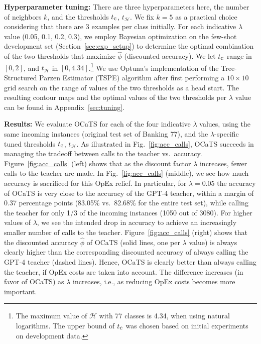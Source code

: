 \documentclass[11pt]{article}
\begin{document}
\vspace{1mm}\noindent\textbf{Hyperparameter tuning:} 
There are three hyperparameters here, the number of neighbors $k$, and the thresholds $t_{\textrm{\small c}}$, $t_\mathcal{H}$. We fix $k=5$ as a practical choice considering that there are 3 examples per class initially. For each indicative $\lambda$ value (0.05, 0.1, 0.2, 0.3), we employ Bayesian optimization on the few-shot development set (Section~\ref{sec:exp_setup}) to determine the optimal combination of the two thresholds that maximize $\hat\phi$ (discounted accuracy). We let $t_{\textrm{\small c}}$ range in $[0,2]$, and $t_\mathcal{H}$ in $[0,4.34]$.\footnote{The maximum  value of $\mathcal{H}$ with 77 classes is 4.34, when using natural logarithms. The upper bound of $t_{\textrm{\small c}}$ was chosen based on initial experiments on development data.} We use Optuna's \cite{optuna_2019} implementation of the Tree-Structured Parzen Estimator (TSPE) algorithm \cite{NIPS2011_86e8f7ab} after first performing a $10\times 10$ grid search on the range of values of the two thresholds as a head start. The resulting contour maps and the optimal values of the two thresholds per $\lambda$ value can be found in Appendix~\ref{sec:tuning}. 


\label{section:results}

\vspace{1mm}\noindent\textbf{Results:} We evaluate OCaTS for each of the four indicative $\lambda$ values, using the same incoming instances (original test set of Banking 77), and the $\lambda$-specific tuned thresholds $t_{\textrm{\small c}}$, $t_\mathcal{H}$. As illustrated in Fig.~\ref{fig:acc_calls}, OCaTS succeeds in managing the tradeoff between calls to the teacher vs.\ accuracy. Figure~\ref{fig:acc_calls} (left) shows that as the discount factor $\lambda$ increases, fewer calls to the teacher are made. In Fig.~\ref{fig:acc_calls} (middle), we see how much accuracy is sacrificed for this OpEx relief. In particular, for $\lambda=0.05$ the accuracy of OCaTS is very close to the accuracy of the GPT-4 teacher, within a margin of 0.37 percentage points (83.05\% vs.\ 82.68\% for the entire test set), while calling the teacher for only 1/3 of the incoming instances (1050 out of 3080). For higher values of $\lambda$, we see the intended drop in accuracy to achieve an increasingly smaller number of calls to the teacher. Figure~\ref{fig:acc_calls} (right) shows that the discounted accuracy $\hat\phi$ of OCaTS (solid lines, one per $\lambda$ value) is always clearly higher than the corresponding discounted accuracy of always calling the GPT-4 teacher (dashed lines). Hence, OCaTS is clearly better than always calling the teacher, if OpEx costs are taken into account. The difference increases (in favor of OCaTS) as $\lambda$ increases, i.e., as  reducing OpEx costs becomes more important.
\end{document}
